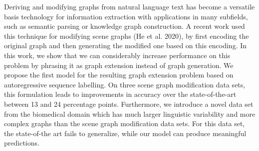 Deriving and modifying graphs from natural language text has become a versatile basis technology for information extraction with applications in many subfields, such as semantic parsing or knowledge graph construction. A recent work used this technique for modifying scene graphs (He et al. 2020), by first encoding the original graph and then generating the modified one based on this encoding. In this work, we show that we can considerably increase performance on this problem by phrasing it as graph extension instead of graph generation. We propose the first model for the resulting graph extension problem based on autoregressive sequence labelling. On three scene graph modification data sets, this formulation leads to improvements in accuracy over the state-of-the-art between 13 and 24 percentage points. Furthermore, we introduce a novel data set from the biomedical domain which has much larger linguistic variability and more complex graphs than the scene graph modification data sets. For this data set, the state-of-the art fails to generalize, while our model can produce meaningful predictions.
